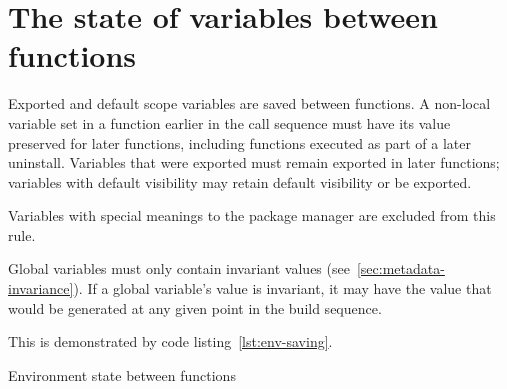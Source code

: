 \section{The state of variables between functions}
\label{sec:ebuild-env-state}

Exported and default scope variables are saved between functions. A non-local variable set in a
function earlier in the call sequence must have its value preserved for later functions, including
functions executed as part of a later uninstall. Variables that were exported must remain exported
in later functions; variables with default visibility may retain default visibility or be exported.

Variables with special meanings to the package manager are excluded from this rule.

Global variables must only contain invariant values (see~\ref{sec:metadata-invariance}). If a global
variable's value is invariant, it may have the value that would be generated at any given point
in the build sequence.

This is demonstrated by code listing~\ref{lst:env-saving}.

\begin{listing}
  \caption{Environment state between functions}\label{lst:env-saving}
  
\end{listing}


